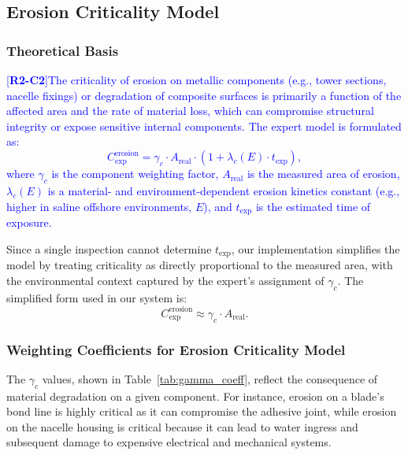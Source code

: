 \documentclass[energies,supfile,submit,pdftex,moreauthors]{Definitions/mdpi}
\newcommand{\revtag}[2]{[\textbf{R#1-C#2}]}
\newcommand{\Rtwo}[1]{\textcolor{blue}{#1}}
\begin{document}
\subsection{Erosion Criticality Model}
\subsubsection{Theoretical Basis}
\Rtwo{\revtag{2}{2}The criticality of erosion on metallic components (e.g., tower sections, nacelle fixings) or degradation of composite surfaces is primarily a function of the affected area and the rate of material loss, which can compromise structural integrity or expose sensitive internal components. The expert model is formulated as:
\begin{equation}
 C_{\text{exp}}^{\text{erosion}} = \gamma_c \cdot A_{\text{real}} \cdot \left(1 + \lambda_c(E) \cdot t_{\text{exp}}\right),
 \label{eq:erosioncrit}
\end{equation}
where \(\gamma_c\) is the component weighting factor, \(A_{\text{real}}\) is the measured area of erosion, \(\lambda_c(E)\) is a material- and environment-dependent erosion kinetics constant (e.g., higher in saline offshore environments, \(E\)), and \(t_{\text{exp}}\) is the estimated time of exposure.
}

Since a single inspection cannot determine \(t_{\text{exp}}\), our implementation simplifies the model by treating criticality as directly proportional to the measured area, with the environmental context captured by the expert's assignment of \(\gamma_c\). The simplified form used in our system is:
\begin{equation}
 C_{\text{exp}}^{\text{erosion}} \approx \gamma_c \cdot A_{\text{real}}.
\end{equation}

\subsubsection{Weighting Coefficients for Erosion Criticality Model}
The \(\gamma_c\) values, shown in Table~\ref{tab:gamma_coeff}, reflect the consequence of material degradation on a given component. For instance, erosion on a blade's bond line is highly critical as it can compromise the adhesive joint, while erosion on the nacelle housing is critical because it can lead to water ingress and subsequent damage to expensive electrical and mechanical systems.
\end{document}
